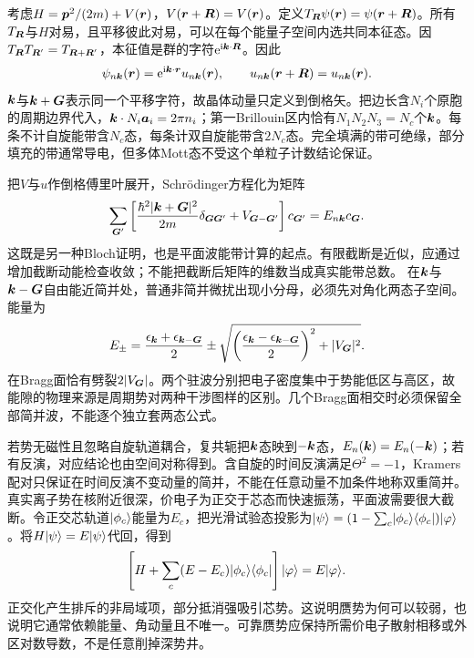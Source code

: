 \label{ch:bands}
考虑$H=\boldsymbol{p}^2/(2m)+V(\boldsymbol{r})$，$V(\boldsymbol{r}+\boldsymbol{R})=V(\boldsymbol{r})$。定义$T_{\boldsymbol{R}}\psi(\boldsymbol{r})=\psi(\boldsymbol{r}+\boldsymbol{R})$。所有$T_{\boldsymbol{R}}$与$H$对易，且平移彼此对易，可以在每个能量子空间内选共同本征态。因$T_{\boldsymbol{R}}T_{\boldsymbol{R}'}=T_{\boldsymbol{R}+\boldsymbol{R}'}$，本征值是群的字符$\mathrm e^{\mathrm i\boldsymbol{k}\cdot\boldsymbol{R}}$。因此
\begin{equation}
\psi_{n\boldsymbol{k}}(\boldsymbol{r})=\mathrm e^{\mathrm i\boldsymbol{k}\cdot\boldsymbol{r}}u_{n\boldsymbol{k}}(\boldsymbol{r}),\qquad u_{n\boldsymbol{k}}(\boldsymbol{r}+\boldsymbol{R})=u_{n\boldsymbol{k}}(\boldsymbol{r}).
\end{equation}
$\boldsymbol{k}$与$\boldsymbol{k}+\boldsymbol{G}$表示同一个平移字符，故晶体动量只定义到倒格矢。把边长含$N_i$个原胞的周期边界代入，$\boldsymbol{k}\cdot N_i\boldsymbol{a}_i=2\pi n_i$；第一Brillouin区内恰有$N_1N_2N_3=N_c$个$\boldsymbol{k}$。每条不计自旋能带含$N_c$态，每条计双自旋能带含$2N_c$态。完全填满的带可绝缘，部分填充的带通常导电，但多体Mott态不受这个单粒子计数结论保证。

把$V$与$u$作倒格傅里叶展开，Schrödinger方程化为矩阵
\begin{equation}
\sum_{\boldsymbol{G}'}\left[\frac{\hbar^2|\boldsymbol{k}+\boldsymbol{G}|^2}{2m}\delta_{\boldsymbol{G}\boldsymbol{G}'}+V_{\boldsymbol{G}-\boldsymbol{G}'}\right]c_{\boldsymbol{G}'}=E_{n\boldsymbol{k}}c_{\boldsymbol{G}}.
\end{equation}
这既是另一种Bloch证明，也是平面波能带计算的起点。有限截断是近似，应通过增加截断动能检查收敛；不能把截断后矩阵的维数当成真实能带总数。
在$\boldsymbol{k}$与$\boldsymbol{k}-\boldsymbol{G}$自由能近简并处，普通非简并微扰出现小分母，必须先对角化两态子空间。能量为
\begin{equation}
E_\pm=\frac{\epsilon_{\boldsymbol{k}}+\epsilon_{\boldsymbol{k}-\boldsymbol{G}}}2\pm\sqrt{\left(\frac{\epsilon_{\boldsymbol{k}}-\epsilon_{\boldsymbol{k}-\boldsymbol{G}}}2\right)^2+|V_{\boldsymbol{G}}|^2}.
\end{equation}
在Bragg面恰有劈裂$2|V_{\boldsymbol{G}}|$。两个驻波分别把电子密度集中于势能低区与高区，故能隙的物理来源是周期势对两种干涉图样的区别。几个Bragg面相交时必须保留全部简并波，不能逐个独立套两态公式。

若势无磁性且忽略自旋轨道耦合，复共轭把$\boldsymbol{k}$态映到$-\boldsymbol{k}$态，$E_n(\boldsymbol{k})=E_n(-\boldsymbol{k})$；若有反演，对应结论也由空间对称得到。含自旋的时间反演满足$\Theta^2=-1$，Kramers配对只保证在时间反演不变动量的简并，不能在任意动量不加条件地称双重简并。
真实离子势在核附近很深，价电子为正交于芯态而快速振荡，平面波需要很大截断。令正交芯轨道$\lvert \phi_c\rangle$能量为$E_c$，把光滑试验态投影为$\lvert \psi\rangle=(1-\sum_c\lvert \phi_c\rangle\langle \phi_c\rvert)\lvert \varphi\rangle$。将$H\lvert \psi\rangle=E\lvert \psi\rangle$代回，得到
\begin{equation}
\left[H+\sum_c(E-E_c)\lvert \phi_c\rangle\langle \phi_c\rvert\right]\lvert \varphi\rangle=E\lvert \varphi\rangle.
\end{equation}
正交化产生排斥的非局域项，部分抵消强吸引芯势。这说明赝势为何可以较弱，也说明它通常依赖能量、角动量且不唯一。可靠赝势应保持所需价电子散射相移或外区对数导数，不是任意削掉深势井。

